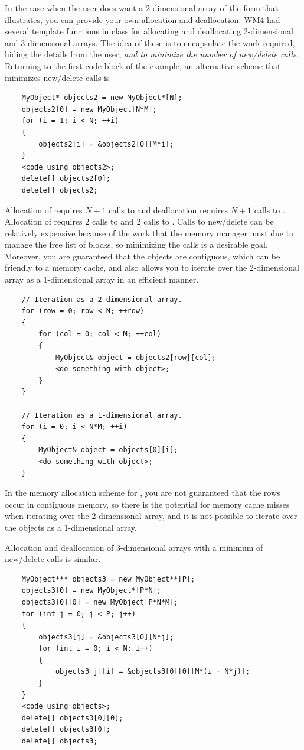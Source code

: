 \documentclass{article}
\begin{document}
In the case when the user does want a 2-dimensional array of the form
that  illustrates, you can provide your own allocation
and deallocation.  WM4 had several template functions in class 
for allocating and deallocating 2-dimensional and 3-dimensional arrays.
The idea of these is to encapsulate the work required, hiding the details
from the user, {\em and to minimize the number of new/delete calls}.
Returning to the first code block of the example, an alternative scheme
that minimizes new/delete calls is
\begin{verbatim}
    MyObject* objects2 = new MyObject*[N];
    objects2[0] = new MyObject[N*M];
    for (i = 1; i < N; ++i)
    {
        objects2[i] = &objects2[0][M*i];
    }
    <code using objects2>;
    delete[] objects2[0];
    delete[] objects2;
\end{verbatim}
Allocation of  requires $N+1$ calls to  and
deallocation requires $N+1$ calls to .  Allocation of
 requires $2$ calls to  and $2$ calls to
.  Calls to new/delete can be relatively expensive because
of the work that the memory manager must due to manage the free list of
blocks, so minimizing the calls is a desirable goal.  Moreover, you are
guaranteed that the   objects are contiguous,
which can be friendly to a memory cache, and also allows you to iterate
over the 2-dimensional array as a 1-dimensional array in an efficient
manner.
\begin{verbatim}
    // Iteration as a 2-dimensional array.
    for (row = 0; row < N; ++row)
    {
        for (col = 0; col < M; ++col)
        {
            MyObject& object = objects2[row][col];
            <do something with object>;
        }
    }
    
    // Iteration as a 1-dimensional array.
    for (i = 0; i < N*M; ++i)
    {
        MyObject& object = objects[0][i];
        <do something with object>;
    }
\end{verbatim}
In the memory allocation scheme for , you are not
guaranteed that the rows occur in contiguous memory, so there is
the potential for memory cache misses when iterating over the
2-dimensional array, and it is not possible to iterate over the
objects as a 1-dimensional array.

Allocation and deallocation of 3-dimensional arrays with a minimum
of new/delete calls is similar.
\begin{verbatim}
    MyObject*** objects3 = new MyObject**[P];
    objects3[0] = new MyObject*[P*N];
    objects3[0][0] = new MyObject[P*N*M];
    for (int j = 0; j < P; j++)
    {
        objects3[j] = &objects3[0][N*j];
        for (int i = 0; i < N; i++)
        {
            objects3[j][i] = &objects3[0][0][M*(i + N*j)];
        }
    }
    <code using objects>;
    delete[] objects3[0][0];
    delete[] objects3[0];
    delete[] objects3;
\end{verbatim}
\end{document}
